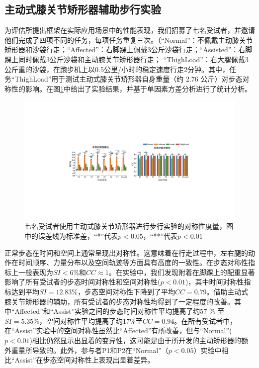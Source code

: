 \subsection{主动式膝关节矫形器辅助步行实验}
为评估所提出框架在实际应用场景中的性能表现，我们招募了七名受试者，并邀请他们完成了四项不同的任务，每项任务重复三次。（``Normal''：不佩戴主动膝关节矫形器和沙袋行走；``Affected''：右脚踝上佩戴3公斤沙袋行走；``Assisted''：右脚踝上同时佩戴3公斤沙袋和主动膝关节矫形器行走； ``ThighLoad''：右大腿佩戴3公斤重的沙袋，在跑步机上以0.5公里/小时的稳定速度行走2分钟。其中，任务``ThighLoad''用于测试主动式膝关节矫形器自身重量（约 2.76 公斤）对步态对称性的影响。在图\ref{fig:5-7}中给出了实验结果，并基于单因素方差分析进行了统计分析。
\begin{figure}[htb]
  \centering\includegraphics[width=1\textwidth]{figures/5-Fig-7.pdf}
  \caption{七名受试者使用主动式膝关节矫形器进行步行实验的对称性度量，图中的误差线为标准差，``*''代表$p \less 0.05$，``**''代表$p \less 0.01$}
  \label{fig:5-7}
\end{figure}

正常步态在时间和空间上通常呈现出对称性。这意味着在行走过程中，左右腿的动作在时间顺序、力量分布以及空间轨迹等方面具有高度的一致性。在步态对称性指标上一般表现为${SI < 6 \%}$和${CC}\approx {1}$\cite{balabanGaitDisturbancesPatients2014}。在实验中，我们发现附着在脚踝上的配重显著影响了所有受试者的步态时间对称性和空间对称性($p<0.01$)，其中时间对称性指标达到平均${SI}=12.83 \%$，步态空间对称性下降到了平均${CC} = 0.79$。借助主动式膝关节矫形器的辅助，所有受试者的步态对称性均得到了一定程度的改善。其中``Affected''和``Assist''实验之间的步态时间对称性平均提高了约57 \% 至${SI} = 5.35 \%$，空间对称性平均提高了约17\%至${CC} = 0.94$。在所有受试者中，在``Assist''实验中的空间对称性虽然比``Affected''有所改善，但与``Normal''($p<0.01$)相比仍然显示出显着的变异性，这可能是由于所开发的主动矫形器的额外重量所导致的。此外，参与者P1和P2在``Normal''（$p<0.05$）实验中相比``Assist''在步态空间对称性上表现出显着差异。

